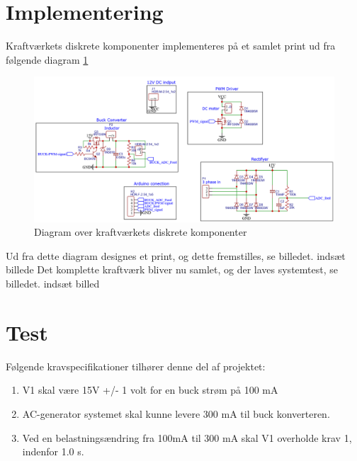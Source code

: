 \documentclass[../main.tex]{subfiles}
\begin{document}
\section{Implementering}
Kraftværkets diskrete komponenter implementeres på et samlet print ud fra følgende diagram \ref{fig: Kraftverk_diagram_samlet}
\begin{figure}[H]
      \includegraphics[width=\textwidth]{Dokumentation/Figures/Kraftverk_diagram_samlet.png}
     \caption{Diagram over kraftværkets diskrete komponenter}
     \label{fig: Kraftverk_diagram_samlet}
     \end{figure}
Ud fra dette diagram designes et print, og dette fremstilles, se billedet.
indsæt billede
Det komplette kraftværk bliver nu samlet, og der laves systemtest, se billedet.
indsæt billed
\section{Test}
Følgende kravspecifikationer tilhører denne del af projektet:
\begin{enumerate}
  \item V1 skal være 15V +/- 1 volt for en buck strøm på 100 mA
  \item AC-generator systemet skal kunne levere 300 mA til buck konverteren.
  \item Ved en belastningsændring fra 100mA til 300 mA skal V1 overholde krav 1, indenfor 1.0 s.
\end{enumerate}
\end{document}
